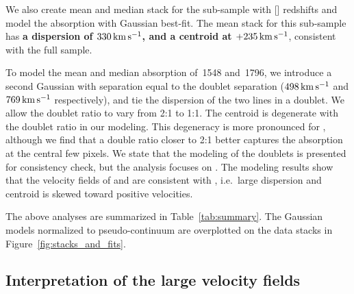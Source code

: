 \documentclass[iop]{emulateapj}
\begin{document}
We also create mean and median stack for the sub-sample with [] redshifts and model the
absorption with Gaussian best-fit. The  mean stack for this sub-sample has
{\bf a dispersion of $330\,{\rm km\,s^{-1}}$, and a centroid at $+235\,{\rm km\,s^{-1}}$},
consistent with the full sample.

To model the mean and median absorption of \,1548 and \,1796, we introduce a
second Gaussian with separation equal to the doublet separation ($498\,{\rm km\,s^{-1}}$ and
$769\,{\rm km\,s^{-1}}$ respectively), and tie the dispersion of the two lines in a doublet. We
allow the doublet ratio to vary from 2:1 to 1:1.
The centroid is degenerate with the doublet ratio in our modeling. This degeneracy is more
pronounced for , although we find that a double ratio closer to 2:1 better captures the
absorption at the central few pixels. We state that the modeling of the doublets is presented for
consistency check, but the analysis focuses on .
The modeling results show that the velocity fields
of  and  are consistent with , i.e.\ large dispersion and centroid
is skewed toward positive velocities.

The above analyses are summarized in Table~\ref{tab:summary}. The Gaussian models normalized to
pseudo-continuum are overplotted on the data stacks in Figure~\ref{fig:stacks_and_fits}.

%


\subsection{Interpretation of the large velocity fields}
\label{sec:significance_width}
\end{document}
